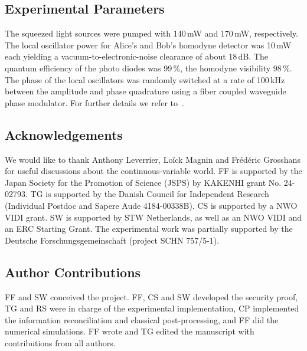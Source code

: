 \documentclass[aps,amsfonts,twoside,amssymb,superscriptaddress,twocolumn]{revtex4-1}
\begin{document}
\subsection{Experimental Parameters}
\label{sec:experimental_parameters}
The squeezed light sources were pumped with 140\,mW and 170\,mW, respectively. The local oscillator power for Alice's and Bob's homodyne detector was 10\,mW each yielding a vacuum-to-electronic-noise clearance of about 18\,dB. The quantum efficiency of the photo diodes was 99\,\%, the homodyne visibility 98\,\%. The phase of the local oscillators was randomly switched at a rate of 100\,kHz between the amplitude and phase quadrature using a fiber coupled waveguide phase modulator. For further details we refer to~\cite{gehring2015CVQKD}.\\


\subsection*{Acknowledgements}
 
 We would like to thank Anthony Leverrier, Lo\"ick Magnin and Fr\'ed\'eric Grosshans for useful discussions about the continuous-variable world. FF is supported by the Japan Society for the Promotion of Science (JSPS) by KAKENHI grant No. 24-02793. TG is supported by the Danish Council for Independent Research  (Individual Postdoc and Sapere Aude 4184-00338B). CS is supported by a NWO VIDI grant. SW is supported by STW Netherlands, as well as an NWO VIDI and an ERC Starting Grant. 
 The experimental work was partially supported by the Deutsche Forschungsgemeinschaft (project SCHN 757/5-1).

\subsection*{Author Contributions} 

FF and SW conceived the project. FF, CS and SW developed the security proof, TG and RS were in charge of the experimental implementation, CP implemented the information reconciliation and classical post-processing, and FF did the numerical simulations. FF wrote and TG edited the manuscript with contributions from all authors.









\end{document}
